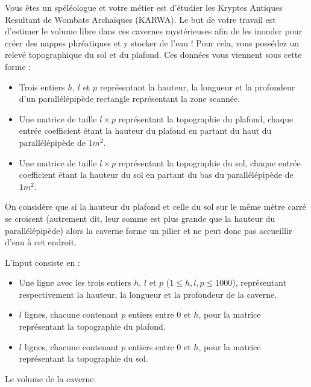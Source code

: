 \problemname{\problemyamlname{}}


Vous êtes un spéléologue et votre métier est d'étudier les Kryptes Antiques Resultant de Wombats Archaïques (KARWA). Le but de votre travail est d'estimer le volume libre dans ces cavernes mystérieuses afin de les inonder pour créer des nappes phréatiques et y stocker de l'eau ! Pour cela, vous possédez un relevé topographique du sol et du plafond. Ces données vous viennent sous cette forme :
\begin{itemize}
\item Trois entiers $h$, $l$ et $p$ représentant la hauteur, la longueur et la profondeur d'un parallélépipède rectangle représentant la zone scannée.
\item Une matrice de taille $l\times p$ représentant la topographie du plafond, chaque entrée coefficient étant la hauteur du plafond en partant du haut du parallélépipède de $1m^2$.
\item Une matrice de taille $l\times p$ représentant la topographie du sol, chaque entrée coefficient étant la hauteur du sol en partant du bas du parallélépipède de $1m^2$.
\end{itemize}

On considère que si la hauteur du plafond et celle du sol sur le même mètre carré se croisent (autrement dit, leur somme est plus grande que la hauteur du parallélépipède) alors la caverne forme un pilier et ne peut donc pas accueillir d'eau à cet endroit.

\begin{Input}
    L'input consiste en :
    \begin{itemize}
        \item Une ligne avec les trois entiers $h$, $l$ et $p$ ($1 \leq h, l, p \leq 1000$), représentant respectivement la hauteur, la longueur et la profondeur de la caverne.
        \item $l$ lignes, chacune contenant $p$ entiers entre $0$ et $h$, pour la matrice représentant la topographie du plafond.
        \item $l$ lignes, chacune contenant $p$ entiers entre $0$ et $h$, pour la matrice représentant la topographie du sol.
    \end{itemize}
\end{Input}

\begin{Output}
    Le volume de la caverne.
\end{Output}
